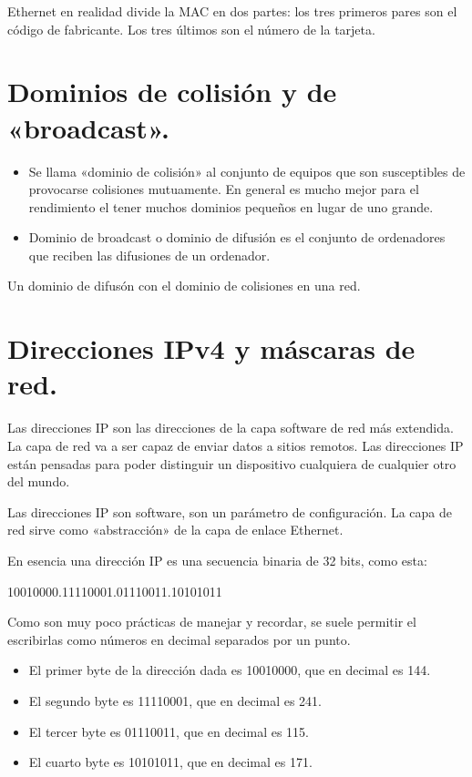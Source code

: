 \documentclass[letterpaper,10pt,spanish]{sphinxmanual}
\begin{document}
Ethernet en realidad divide la MAC en dos partes: los tres primeros pares son el código de fabricante. Los tres últimos son el número de la tarjeta.


\section{Dominios de colisión y de «broadcast».}
\label{\detokenize{t2_integracion_elementos/apuntes_t2:dominios-de-colision-y-de-broadcast}}\begin{itemize}
\item {} 
Se llama «dominio de colisión» al conjunto de equipos que son susceptibles de provocarse colisiones mutuamente. En general es mucho mejor para el rendimiento el tener muchos dominios pequeños en lugar de uno grande.

\item {} 
Dominio de broadcast o dominio de difusión es el conjunto de ordenadores que reciben las difusiones de un ordenador.

\end{itemize}

Un dominio de difusón  con el dominio de colisiones en una red.


\section{Direcciones IPv4 y máscaras de red.}
\label{\detokenize{t2_integracion_elementos/apuntes_t2:direcciones-ipv4-y-mascaras-de-red}}
Las direcciones IP son las direcciones de la capa software de red más extendida. La capa de red va a ser capaz de enviar datos a sitios remotos. Las direcciones IP están pensadas para poder distinguir un dispositivo cualquiera de cualquier otro del mundo.

Las direcciones IP son software, son un parámetro de configuración. La capa de red sirve como «abstracción» de la capa de enlace Ethernet.

En esencia una dirección IP es una secuencia binaria de 32 bits, como esta:

10010000.11110001.01110011.10101011

Como son muy poco prácticas de manejar y recordar, se suele permitir el escribirlas como números en decimal separados por un punto.
\begin{itemize}
\item {} 
El primer byte de la dirección dada es 10010000, que en decimal es 144.

\item {} 
El segundo byte es 11110001, que en decimal es 241.

\item {} 
El tercer byte es 01110011, que en decimal es 115.

\item {} 
El cuarto byte es 10101011, que en decimal es 171.

\end{itemize}
\end{document}
